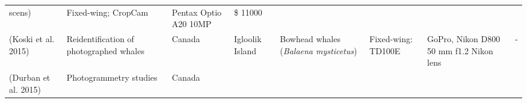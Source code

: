 \documentclass[]{interact}
\theoremstyle{plain}%
\theoremstyle{definition}
\theoremstyle{remark}
\begin{document}
\begin{longtable}[]{@{}llllllll@{}}
\begin{minipage}[t]{0.10\columnwidth}
{scens})\strut
\end{minipage} & \begin{minipage}[t]{0.09\columnwidth}\raggedright\strut
Fixed-wing; CropCam\strut
\end{minipage} & \begin{minipage}[t]{0.11\columnwidth}\raggedright\strut
Pentax Optio A20 10MP\strut
\end{minipage} & \begin{minipage}[t]{0.01\columnwidth}\raggedright\strut
\$ 11000\strut
\end{minipage}\tabularnewline
\begin{minipage}[t]{0.11\columnwidth}\raggedright\strut
(Koski et al. 2015)\strut
\end{minipage} & \begin{minipage}[t]{0.18\columnwidth}\raggedright\strut
Reidentification of photographed whales\strut
\end{minipage} & \begin{minipage}[t]{0.03\columnwidth}\raggedright\strut
Canada\strut
\end{minipage} & \begin{minipage}[t]{0.14\columnwidth}\raggedright\strut
Igloolik Island\strut
\end{minipage} & \begin{minipage}[t]{0.10\columnwidth}\raggedright\strut
Bowhead whales (\emph{Balaena mysticetus})\strut
\end{minipage} & \begin{minipage}[t]{0.09\columnwidth}\raggedright\strut
Fixed-wing: TD100E\strut
\end{minipage} & \begin{minipage}[t]{0.11\columnwidth}\raggedright\strut
GoPro, Nikon D800 50 mm f1.2 Nikon lens\strut
\end{minipage} & \begin{minipage}[t]{0.01\columnwidth}\raggedright\strut
-\strut
\end{minipage}\tabularnewline
\begin{minipage}[t]{0.11\columnwidth}\raggedright\strut
(Durban et al. 2015)\strut
\end{minipage} & \begin{minipage}[t]{0.18\columnwidth}\raggedright\strut
Photogrammetry studies\strut
\end{minipage} & \begin{minipage}[t]{0.03\columnwidth}\raggedright\strut
Canada\strut
\end{minipage} & \begin{minipage}[t]{0.14\columnwidth}\raggedright\strut

\end{minipage}
\end{longtable}
\end{document}
